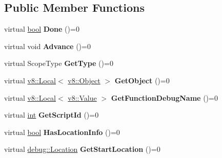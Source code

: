 \subsection*{Public Member Functions}
\begin{DoxyCompactItemize}
\item 
\mbox{\label{classv8_1_1debug_1_1ScopeIterator_a72ac197a5ef82056d44362b5ced56d0e}} 
virtual \mbox{\hyperlink{classbool}{bool}} {\bfseries Done} ()=0
\item 
\mbox{\label{classv8_1_1debug_1_1ScopeIterator_a92fec1678b3ce45e7e1d0c6d12ae5ddb}} 
virtual void {\bfseries Advance} ()=0
\item 
\mbox{\label{classv8_1_1debug_1_1ScopeIterator_ad3e6ae710a5f1d336074e9db63cf8a4a}} 
virtual Scope\+Type {\bfseries Get\+Type} ()=0
\item 
\mbox{\label{classv8_1_1debug_1_1ScopeIterator_a8e110c598c50e21cb02f2ba8af7f5edf}} 
virtual \mbox{\hyperlink{classv8_1_1Local}{v8\+::\+Local}}$<$ \mbox{\hyperlink{classv8_1_1Object}{v8\+::\+Object}} $>$ {\bfseries Get\+Object} ()=0
\item 
\mbox{\label{classv8_1_1debug_1_1ScopeIterator_a8ac2cf60212bf1f4ccdb6fa108edaf7a}} 
virtual \mbox{\hyperlink{classv8_1_1Local}{v8\+::\+Local}}$<$ \mbox{\hyperlink{classv8_1_1Value}{v8\+::\+Value}} $>$ {\bfseries Get\+Function\+Debug\+Name} ()=0
\item 
\mbox{\label{classv8_1_1debug_1_1ScopeIterator_a0a517ca94e126f3155577f486e34d961}} 
virtual \mbox{\hyperlink{classint}{int}} {\bfseries Get\+Script\+Id} ()=0
\item 
\mbox{\label{classv8_1_1debug_1_1ScopeIterator_adf784be449e5e7fdd40cc75ff1758981}} 
virtual \mbox{\hyperlink{classbool}{bool}} {\bfseries Has\+Location\+Info} ()=0
\item 
\mbox{\label{classv8_1_1debug_1_1ScopeIterator_ac6606bae83f9c085fd7629cbc0d2fc2f}} 
virtual \mbox{\hyperlink{classv8_1_1debug_1_1Location}{debug\+::\+Location}} {\bfseries Get\+Start\+Location} ()=0

\end{DoxyCompactItemize}

